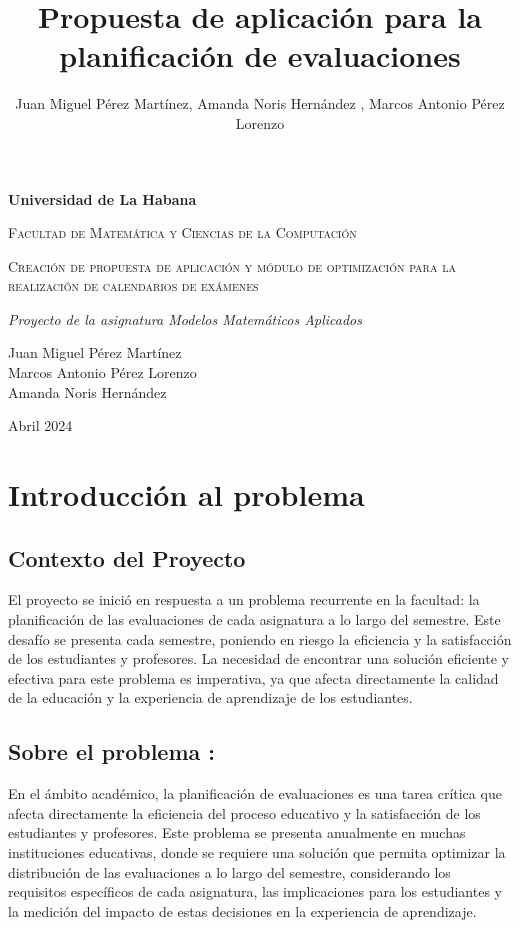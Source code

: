 \documentclass{article}
\title {Propuesta de aplicación para la planificación de evaluaciones}
\author{Juan Miguel Pérez Martínez, Amanda Noris Hernández , Marcos Antonio Pérez Lorenzo}
\begin{document}
\begin{titlepage}
\centering
{\bfseries\LARGE Universidad de La Habana \par}
\vspace{1cm}
{\scshape\Large Facultad de Matemática y Ciencias de la Computación \par}
\vspace{3cm}
{\scshape\Huge Creaci\'on de propuesta de aplicaci\'on y módulo de optimizaci\'on para la realizaci\'on de calendarios de ex\'amenes  \par}
\vspace{3cm}
{\itshape\Large Proyecto de la asignatura Modelos Matem\'aticos Aplicados\par}
\vfill
{\Large  Juan Miguel P\'erez Martínez  \\
Marcos Antonio Pérez Lorenzo  \\
Amanda Noris Hernández\par}

\vfill
{\Large Abril 2024 \par}
\end{titlepage}
\section{Introducción al problema}

\subsection{Contexto del Proyecto}

El proyecto se inició en respuesta a un problema recurrente en la facultad: la planificación de las evaluaciones de cada asignatura a lo largo del semestre. Este desafío se presenta cada semestre, poniendo en riesgo la eficiencia y la satisfacción de los estudiantes y profesores. La necesidad de encontrar una solución eficiente y efectiva para este problema es imperativa, ya que afecta directamente la calidad de la educación y la experiencia de aprendizaje de los estudiantes.
\subsection{Sobre el problema :}

En el ámbito académico, la planificación de evaluaciones es una tarea crítica que afecta directamente la eficiencia del proceso educativo y la satisfacción de los estudiantes y profesores. Este problema se presenta anualmente en muchas instituciones educativas, donde se requiere una solución que permita optimizar la distribución de las evaluaciones a lo largo del semestre, considerando los requisitos específicos de cada asignatura, las implicaciones para los estudiantes y la medición del impacto de estas decisiones en la experiencia de aprendizaje.
\end{document}
